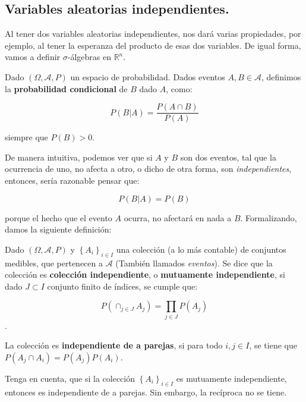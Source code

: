 
\subsection{Variables aleatorias independientes.}	

Al tener dos variables aleatorias independientes, nos dará varias propiedades, por ejemplo, al tener la esperanza del producto de esas dos variables. De igual forma, vamos a definir $\sigma$-álgebras en $\mathbb{R}^n$.

\begin{boxDef}
	Dado $(\Omega, \mathcal{A}, P)$ un espacio de probabilidad. Dados eventos $A, B \in \mathcal{A}$, definimos la \textbf{probabilidad condicional} de $B$ dado $A$, como:

	\[
		P(B \vert A) = \frac{P(A \cap B)}{P(A)}
	\]

	siempre que $P(B) > 0$.

\end{boxDef}

De manera intuitiva, podemos ver que si $A$ y $B$ son dos eventos, tal que la ocurrencia de uno, no afecta a otro, o dicho de otra forma, son \textit{independientes}, entonces, sería razonable pensar que:

\[
	P(B \vert A) = P(B)
\]

porque el hecho que el evento $A$ ocurra, no afectará en nada a $B$. Formalizando, damos la siguiente definición:

\begin{boxDef}

	Dado $(\Omega, \mathcal{A}, P)$ y $\left\{ A_i \right\}_{i \in I}$ una colección (a lo más contable) de conjuntos medibles, que pertenecen a $\mathcal{A}$ (También llamados \textit{eventos}). Se dice que la colección es \textbf{colección independiente}, o \textbf{mutuamente independiente}, si dado $J \subset I$ conjunto finito de índices, se cumple que:

	\[
		P \left( \cap_{j \in J} A_j \right) = \prod_{j \in J} P(A_j)
	\].

	La colección es \textbf{independiente de a parejas}, si para todo $i, j \in I$, se tiene que $P(A_j \cap A_i) = P(A_j) P(A_i)$. 
	
\end{boxDef}

Tenga en cuenta, que si la colección $\left\{ A_i \right\}_{i \in I}$ es mutuamente independiente, entonces es independiente de a parejas. Sin embargo, la recíproca no se tiene.\\

